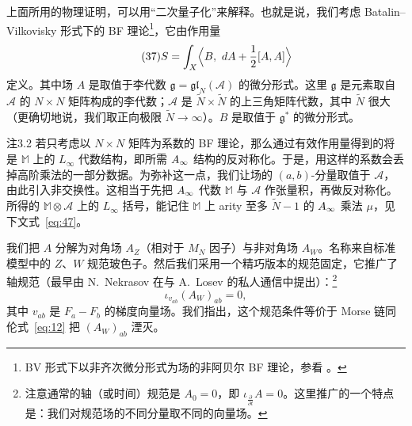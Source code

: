 上面所用的物理证明，可以用“二次量子化”来解释。也就是说，我们考虑 Batalin--Vilkovisky 形式下的 BF 理论\footnote{BV 形式下以非齐次微分形式为场的非阿贝尔 BF 理论，参看 \cite{cattaneo}。}，它由作用量
\begin{equation}\tag{37}\label{eq:37}
S=\int_X\Bigl\langle B,\ dA+\frac12[A,A]\Bigr\rangle
\end{equation}
定义。其中场 $A$ 是取值于李代数 $\mathfrak g=\mathfrak{gl}_N(\mathcal A)$ 的微分形式。这里 $\mathfrak g$ 是元素取自 $\mathcal A$ 的 $N\times N$ 矩阵构成的李代数；$\mathcal A$ 是 $\widetilde N\times\widetilde N$ 的上三角矩阵代数，其中 $\widetilde N$ 很大（更确切地说，我们取正向极限 $\widetilde N\to\infty$）。$B$ 是取值于 $\mathfrak g^*$ 的微分形式。


\begin{thmenv}{注}{3.2}\label{rem:3.2}
若只考虑以 $N\times N$ 矩阵为系数的 BF 理论，那么通过有效作用量得到的将是 $\mathbb{M}$ 上的 $L_\infty$ 代数结构，即所需 $A_\infty$ 结构的反对称化。于是，用这样的系数会丢掉高阶乘法的一部分数据。为弥补这一点，我们让场的 $(a,b)$-分量取值于 $\mathcal A$，由此引入非交换性。这相当于先把 $A_\infty$ 代数 $\mathbb{M}$ 与 $\mathcal A$ 作张量积，再做反对称化。所得的 $\mathbb{M}\otimes\mathcal A$ 上的 $L_\infty$ 括号，能记住 $\mathbb{M}$ 上 arity 至多 $\widetilde N-1$ 的 $A_\infty$ 乘法 $\mu$，见下文式~\eqref{eq:47}。
\end{thmenv}


我们把 $A$ 分解为对角场 $A_Z$（相对于 $M_N$ 因子）与非对角场 $A_W$。名称来自标准模型中的 $Z$、$W$ 规范玻色子。然后我们采用一个精巧版本的规范固定，它推广了轴规范（最早由 N.~Nekrasov 在与 A.~Losev 的私人通信中提出）：\footnote{注意通常的轴（或时间）规范是 $A_0=0$，即 $\iota_{\frac{\partial}{\partial t}}A=0$。这里推广的一个特点是：我们对规范场的不同分量取不同的向量场。}
\begin{equation}\tag{38}\label{eq:38}
\iota_{v_{ab}}(A_W)_{ab}=0,
\end{equation}
其中 $v_{ab}$ 是 $F_a-F_b$ 的梯度向量场。我们指出，这个规范条件等价于 Morse 链同伦式~\eqref{eq:12} 把 $(A_W)_{ab}$ 湮灭。

